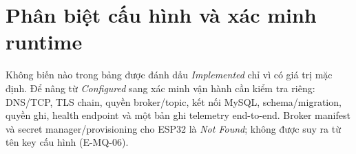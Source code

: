 \section{Phân biệt cấu hình và xác minh runtime}

Không biến nào trong bảng được đánh dấu \textit{Implemented} chỉ vì có giá trị mặc
định. Để nâng từ \textit{Configured} sang xác minh vận hành cần kiểm tra riêng: DNS/TCP,
TLS chain, quyền broker/topic, kết nối MySQL, schema/migration, quyền ghi, health endpoint
và một bản ghi telemetry end-to-end. Broker manifest và secret manager/provisioning cho
ESP32 là \textit{Not Found}; không được suy ra từ tên key cấu hình (E-MQ-06).
